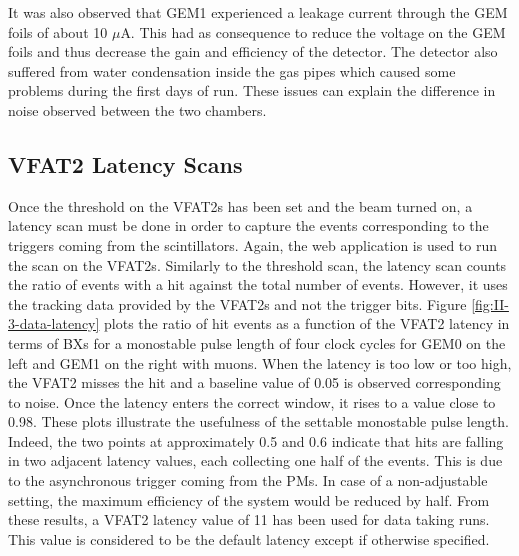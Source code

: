      It was also observed that GEM1 experienced a leakage current through the GEM foils of about 10 $\mu$A. This had as consequence to reduce the voltage on the GEM foils and thus decrease the gain and efficiency of the detector. The detector also suffered from water condensation inside the gas pipes which caused some problems during the first days of run. These issues can explain the difference in noise observed between the two chambers.

    \subsection{VFAT2 Latency Scans}

      Once the threshold on the VFAT2s has been set and the beam turned on, a latency scan must be done in order to capture the events corresponding to the triggers coming from the scintillators. Again, the web application is used to run the scan on the VFAT2s. Similarly to the threshold scan, the latency scan counts the ratio of events with a hit against the total number of events. However, it uses the tracking data provided by the VFAT2s and not the trigger bits. Figure \ref{fig:II-3-data-latency} plots the ratio of hit events as a function of the VFAT2 latency in terms of BXs for a monostable pulse length of four clock cycles for GEM0 on the left and GEM1 on the right with muons. When the latency is too low or too high, the VFAT2 misses the hit and a baseline value of 0.05 is observed corresponding to noise. Once the latency enters the correct window, it rises to a value close to 0.98. These plots illustrate the usefulness of the settable monostable pulse length. Indeed, the two points at approximately 0.5 and 0.6 indicate that hits are falling in two adjacent latency values, each collecting one half of the events. This is due to the asynchronous trigger coming from the PMs. In case of a non-adjustable setting, the maximum efficiency of the system would be reduced by half. From these results, a VFAT2 latency value of 11 has been used for data taking runs. This value is considered to be the default latency except if otherwise specified. \\

